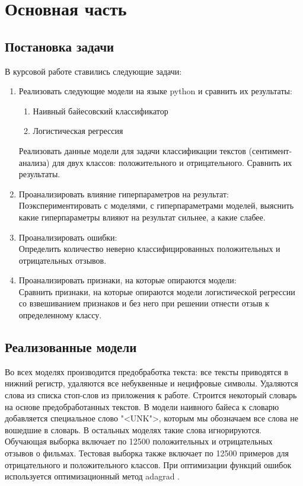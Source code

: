 \chapter{Основная часть}

\section{Постановка задачи}
В курсовой работе ставились следующие задачи:
\begin{enumerate}
\item Реализовать следующие модели на языке python и сравнить их результаты:
	\begin{enumerate}
	\item Наивный байесовский классификатор
	\item Логистическая регрессия
	\end{enumerate}
Реализовать данные модели для задачи классификации текстов (сентимент-анализа) для двух классов: положительного и отрицательного. Сравнить их результаты.
\item Проанализировать влияние гиперпараметров на результат: \\
Поэкспериментировать с моделями, с гиперпараметрами моделей, выяснить какие гиперпараметры влияют на результат сильнее, а какие слабее.

\item Проанализировать ошибки: \\
Определить количество неверно классифицированных положительных и отрицательных отзывов.

\item Проанализировать признаки, на которые опираются модели: \\
Сравнить признаки, на которые опираются модели логистической регрессии со взвешиванием признаков и без него при решении отнести отзыв к определенному классу.
\end{enumerate}

\section{Реализованные модели}
Во всех моделях производится предобработка текста: все тексты приводятся в нижний регистр, удаляются все небуквенные и нецифровые символы. Удаляются слова из списка стоп-слов из приложения к работе. Строится некоторый словарь на основе предобработанных текстов. В модели наивного байеса к словарю добавляется специальное слово "<UNK">, которым мы обозначаем все слова не вошедшие в словарь. В остальных моделях такие слова игнорируются. Обучающая выборка включает по 12500 положительных и отрицательных отзывов о фильмах. Тестовая выборка также включает по 12500 примеров для отрицательного и положительного классов. При оптимизации функций ошибок используется оптимизационный метод adagrad \cite{adagrad:JohnDuchi}.


